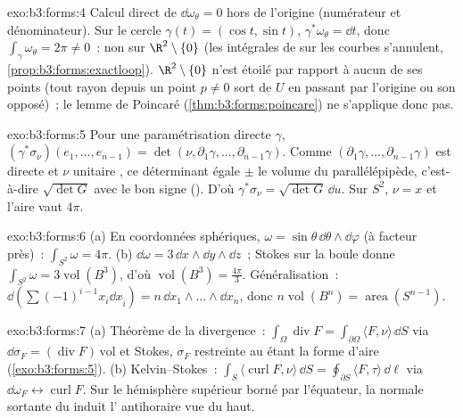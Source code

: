 \begin{solution}{exo:b3:forms:4}
Calcul direct de $\dd\omega_\theta = 0$ hors de l'origine
(numérateur et dénominateur). Sur le cercle $\gamma(t) =
(\cos t, \sin t)$, $\gamma^*\omega_\theta = \dd t$, donc
$\int_\gamma\omega_\theta = 2\pi \neq 0$~: non  sur
$\R^2\setminus\{0\}$ (les intégrales de  sur
les courbes  s'annulent,
\cref{prop:b3:forms:exactloop}). $\R^2\setminus\{0\}$ n'est
étoilé par rapport à aucun de ses points (tout rayon depuis
un point $p \neq 0$ sort de $U$ en passant par l'origine ou
son opposé)~; le lemme de Poincaré
(\cref{thm:b3:forms:poincare}) ne s'applique donc pas.
\end{solution}

\begin{solution}{exo:b3:forms:5}
Pour une paramétrisation directe $\gamma$,
$(\gamma^*\sigma_\nu)(e_1,\dots,e_{n-1}) =
\det(\nu,\partial_1\gamma,\dots,\partial_{n-1}\gamma)$.
Comme $(\partial_1\gamma,\dots,\partial_{n-1}\gamma)$ est
directe et $\nu$ unitaire , ce déterminant égale
$\pm$ le volume du parallélépipède, c'est-à-dire
$\sqrt{\det G}$ avec le bon signe (). D'où
$\gamma^*\sigma_\nu = \sqrt{\det G}\,\dd u$. Sur $S^2$,
$\nu = x$ et l'aire vaut $4\pi$.
\end{solution}

\begin{solution}{exo:b3:forms:6}
(a) En coordonnées sphériques, $\omega =
\sin\theta\,\dd\theta\wedge\dd\varphi$ (à facteur près)~:
$\int_{S^2}\omega = 4\pi$. (b) $\dd\omega =
3\,\dd x\wedge\dd y\wedge\dd z$~; Stokes sur la boule
donne $\int_{S^2}\omega = 3\operatorname{vol}(B^3)$, d'où
$\operatorname{vol}(B^3) = \frac{4\pi}3$. Généralisation~:
$\dd(\sum(-1)^{i-1}x_i\dd x_{\hat i}) = n\,\dd x_1\wedge
\dots\wedge\dd x_n$, donc $n\operatorname{vol}(B^n) =
\operatorname{area}(S^{n-1})$.
\end{solution}

\begin{solution}{exo:b3:forms:7}
(a) Théorème de la divergence~: $\int_\Omega\operatorname{div}
F = \int_{\partial\Omega}\langle F,\nu\rangle\,\dd S$ via
$\dd\sigma_F = (\operatorname{div}F)\,\mathrm{vol}$ et
Stokes, $\sigma_F$ restreinte au  étant la forme d'aire
(\cref{exo:b3:forms:5}). (b) Kelvin--Stokes~:
$\int_S\langle\operatorname{curl}F,\nu\rangle\,\dd S =
\oint_{\partial S}\langle F,\tau\rangle\,\dd\ell$ via
$\dd\omega_F \leftrightarrow \operatorname{curl}F$. Sur le
hémisphère supérieur borné par l'équateur, la normale
sortante du  induit l' antihoraire vue du
haut.
\end{solution}


